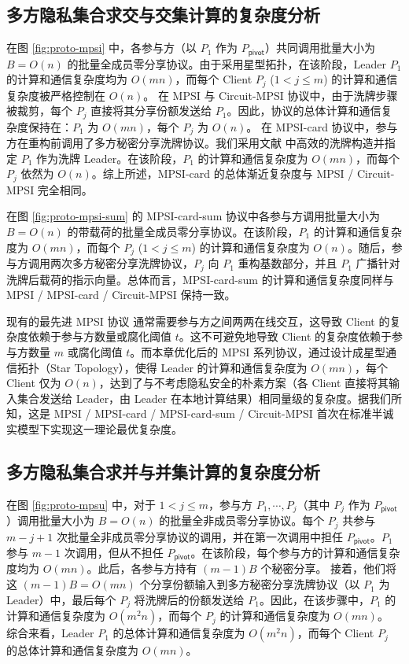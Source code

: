 \subsection{多方隐私集合求交与交集计算的复杂度分析} 

在图 \ref{fig:proto-mpsi} 中，各参与方（以 $P_1$ 作为 $P_\mathsf{pivot}$）共同调用批量大小为 $B = O(n)$ 的批量全成员零分享协议。由于采用星型拓扑，在该阶段，Leader $P_1$ 的计算和通信复杂度均为 $O(mn)$，而每个 Client $P_j$ ($1 < j \le m$) 的计算和通信复杂度被严格控制在 $O(n)$。
在 MPSI 与 Circuit-MPSI 协议中，由于洗牌步骤被裁剪，每个 $P_j$ 直接将其分享份额发送给 $P_1$。因此，协议的总体计算和通信复杂度保持在：$P_1$ 为 $O(mn)$，每个 $P_j$ 为 $O(n)$。
在 MPSI-card 协议中，参与方在重构前调用了多方秘密分享洗牌协议。我们采用文献 \cite{EB22} 中高效的洗牌构造并指定 $P_1$ 作为洗牌 Leader。在该阶段，$P_1$ 的计算和通信复杂度为 $O(mn)$，而每个 $P_j$ 依然为 $O(n)$。综上所述，MPSI-card 的总体渐近复杂度与 MPSI / Circuit-MPSI 完全相同。

在图 \ref{fig:proto-mpsi-sum} 的 MPSI-card-sum 协议中各参与方调用批量大小为 $B = O(n)$ 的带载荷的批量全成员零分享协议。在该阶段，$P_1$ 的计算和通信复杂度为 $O(mn)$，而每个 $P_j$ ($1 < j \le m$) 的计算和通信复杂度为 $O(n)$。随后，参与方调用两次多方秘密分享洗牌协议，$P_j$ 向 $P_1$ 重构基数部分，并且 $P_1$ 广播针对洗牌后载荷的指示向量。总体而言，MPSI-card-sum 的计算和通信复杂度同样与 MPSI / MPSI-card / Circuit-MPSI 保持一致。

现有的最先进 MPSI 协议 \cite{WuYC24,ChenDGB22} 通常需要参与方之间两两在线交互，这导致 Client 的复杂度依赖于参与方数量或腐化阈值 $t$。这不可避免地导致 Client 的复杂度依赖于参与方数量 $m$ 或腐化阈值 $t$。而本章优化后的 MPSI 系列协议，通过设计成星型通信拓扑（Star Topology），使得 Leader 的计算和通信复杂度为 $O(mn)$，每个 Client 仅为 $O(n)$，达到了与不考虑隐私安全的朴素方案（各 Client 直接将其输入集合发送给 Leader，由 Leader 在本地计算结果）相同量级的复杂度。据我们所知，这是 MPSI / MPSI-card / MPSI-card-sum / Circuit-MPSI 首次在标准半诚实模型下实现这一理论最优复杂度。

\subsection{多方隐私集合求并与并集计算的复杂度分析}

在图 \ref{fig:proto-mpsu} 中，对于 $1 < j \le m$，参与方 $P_1, \cdots, P_j$（其中 $P_j$ 作为 $P_\mathsf{pivot}$）调用批量大小为 $B = O(n)$ 的批量全非成员零分享协议。每个 $P_j$ 共参与 $m-j+1$ 次批量全非成员零分享协议的调用，并在第一次调用中担任 $P_\mathsf{pivot}$。$P_1$ 参与 $m-1$ 次调用，但从不担任 $P_\mathsf{pivot}$。在该阶段，每个参与方的计算和通信复杂度均为 $O(mn)$。此后，各参与方持有 $(m-1)B$ 个秘密分享。
接着，他们将这 $(m-1)B = O(mn)$ 个分享份额输入到多方秘密分享洗牌协议（以 $P_1$ 为 Leader）中，最后每个 $P_j$ 将洗牌后的份额发送给 $P_1$。因此，在该步骤中，$P_1$ 的计算和通信复杂度为 $O(m^2n)$，而每个 $P_j$ 的计算和通信复杂度为 $O(mn)$。
综合来看，Leader $P_1$ 的总体计算和通信复杂度为 $O(m^2n)$，而每个 Client $P_j$ 的总体计算和通信复杂度为 $O(mn)$。

